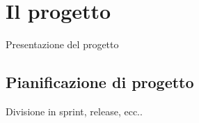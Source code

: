 
\chapter{Il progetto}
Presentazione del progetto

\section{Pianificazione di progetto}
Divisione in sprint, release, ecc..